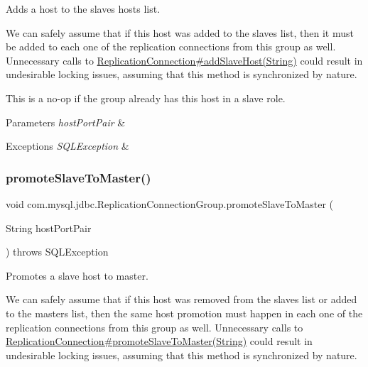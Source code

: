 Adds a host to the slaves hosts list.

We can safely assume that if this host was added to the slaves list, then it must be added to each one of the replication connections from this group as well. Unnecessary calls to \mbox{\hyperlink{}{Replication\+Connection\#add\+Slave\+Host(\+String)}} could result in undesirable locking issues, assuming that this method is synchronized by nature.

This is a no-\/op if the group already has this host in a slave role.


\begin{DoxyParams}{Parameters}
{\em host\+Port\+Pair} & \\
\hline
\end{DoxyParams}

\begin{DoxyExceptions}{Exceptions}
{\em S\+Q\+L\+Exception} & \\
\hline
\end{DoxyExceptions}
\mbox{\label{classcom_1_1mysql_1_1jdbc_1_1_replication_connection_group_a140b14f491bedc6744398fa71dc3519a}} 
\subsubsection{\texorpdfstring{promote\+Slave\+To\+Master()}{promoteSlaveToMaster()}}
{\footnotesize\ttfamily void com.\+mysql.\+jdbc.\+Replication\+Connection\+Group.\+promote\+Slave\+To\+Master (\begin{DoxyParamCaption}\item[{String}]{host\+Port\+Pair }\end{DoxyParamCaption}) throws S\+Q\+L\+Exception}

Promotes a slave host to master.

We can safely assume that if this host was removed from the slaves list or added to the masters list, then the same host promotion must happen in each one of the replication connections from this group as well. Unnecessary calls to \mbox{\hyperlink{}{Replication\+Connection\#promote\+Slave\+To\+Master(\+String)}} could result in undesirable locking issues, assuming that this method is synchronized by nature.

